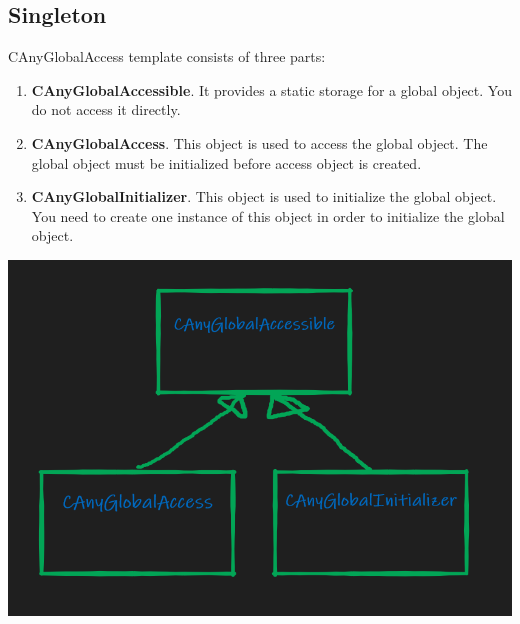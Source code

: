 \documentclass{article}
\begin{document}
\subsection{Singleton}\label{section::Singleton}
CAnyGlobalAccess template consists of three parts:
\begin{enumerate}
\item \textbf{CAnyGlobalAccessible}. It provides a static storage for a global object. You do not access it directly.
\item \textbf{CAnyGlobalAccess}. This object is used to access the global object. The global object must be initialized before access object is created.
\item \textbf{CAnyGlobalInitializer}. This object is used to initialize the global object. You need to create one instance of this object in order to initialize the global object.
\end{enumerate}
\begin{center}
\includegraphics[scale = 0.3]{Figures/CAnyGlobalAccess.png}
\end{center}
\end{document}

